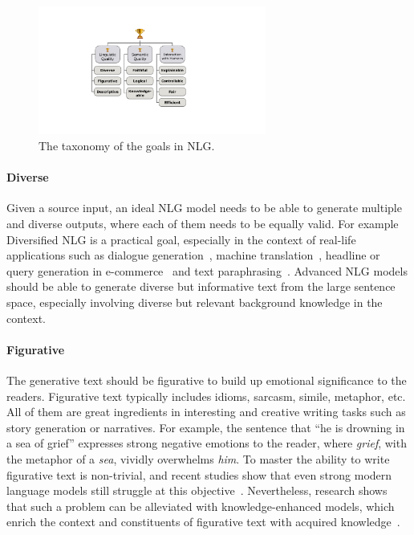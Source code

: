 \begin{figure}[t]
    \centering
    \includegraphics[width=7.5cm]{submissions/reasoning-nlp/figs/taxonomy.pdf}
    \caption{The taxonomy of the goals in NLG.}
    \label{fig:taxonomy}
\end{figure}


\paragraph{Diverse}


Given a source input, an ideal NLG model needs to be able to generate multiple and diverse outputs, where each of them needs to be equally valid.
For example
Diversified NLG is a practical goal, especially in the context of real-life applications such as dialogue generation~\cite{wu-etal-2020-diverse}, machine translation~\cite{shen2019mixture}, headline or query generation in e-commerce~\cite{10.1145/3488560.3498431} and text paraphrasing~\cite{10.1007/978-3-030-88480-2_28}.
Advanced NLG models should be able to generate diverse but informative text from the large sentence space, especially involving diverse but relevant background knowledge in the context.

\paragraph{Figurative}

The generative text should be figurative to build up emotional significance to the readers.
Figurative text typically includes idioms, sarcasm, simile, metaphor, etc.
All of them are great ingredients in interesting and creative writing tasks such as story generation or narratives.
For example, the sentence that ``he is drowning in a sea of grief'' expresses strong negative emotions to the reader, where \textit{grief}, with the metaphor of a \textit{sea}, vividly overwhelms \textit{him}.
To master the ability to write figurative text is non-trivial, and recent studies show that even strong modern language models still struggle at this objective~\cite{he-etal-2022-pre,liu-etal-2022-testing,chen-etal-2022-e}.
Nevertheless, research shows that such a problem can be alleviated with knowledge-enhanced models, which enrich the context and constituents of figurative text with acquired knowledge~\cite{chakrabarty-etal-2022-rocket}.



